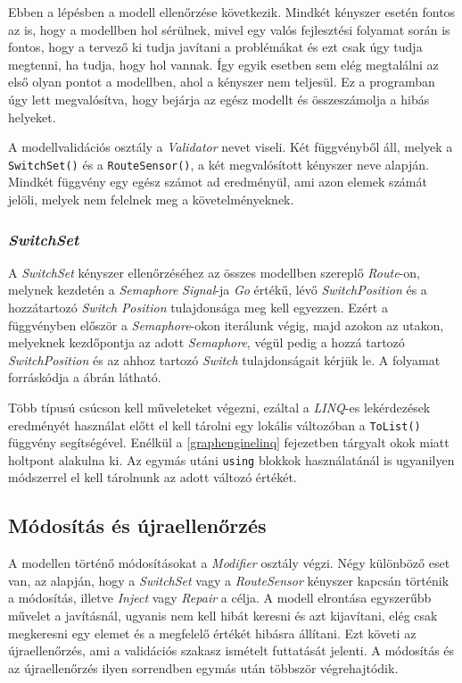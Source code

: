 Ebben a lépésben a modell ellenőrzése következik. Mindkét kényszer esetén fontos az is, hogy a modellben hol sérülnek, mivel egy valós fejlesztési folyamat során is fontos, hogy a tervező ki tudja javítani a problémákat és ezt csak úgy tudja megtenni, ha tudja, hogy hol vannak. Így egyik esetben sem elég megtalálni az első olyan pontot a modellben, ahol a kényszer nem teljesül. Ez a programban úgy lett megvalósítva, hogy bejárja az egész modellt és összeszámolja a hibás helyeket.

A modellvalidációs osztály a \emph{Validator} nevet viseli. Két függvényből áll, melyek a \texttt{SwitchSet()} és a \texttt{RouteSensor()}, a két megvalósított kényszer neve alapján. Mindkét függvény egy egész számot ad eredményül, ami azon elemek számát jelöli, melyek nem felelnek meg a követelményeknek. 

\subsubsection{\emph{SwitchSet}}

A \emph{SwitchSet} kényszer ellenőrzéséhez az összes modellben szereplő \emph{Route}-on, melynek kezdetén a \emph{Semaphore} \emph{Signal}-ja \emph{Go} értékű, lévő \emph{SwitchPosition} és a hozzátartozó \emph{Switch} \emph{Position} tulajdonsága meg kell egyezzen. Ezért a függvényben először a \emph{Semaphore}-okon iterálunk végig, majd azokon az utakon, melyeknek kezdőpontja az adott \emph{Semaphore}, végül pedig a hozzá tartozó \emph{SwitchPosition} és az ahhoz tartozó \emph{Switch} tulajdonságait kérjük le. A folyamat forráskódja a ábrán látható.

Több típusú csúcson kell műveleteket végezni, ezáltal a \emph{LINQ}-es lekérdezések eredményét használat előtt el kell tárolni egy lokális változóban a \texttt{ToList()} függvény segítségével. Enélkül a \ref{graphenginelinq} fejezetben tárgyalt okok miatt holtpont alakulna ki. Az egymás utáni \texttt{using} blokkok használatánál is ugyanilyen módszerrel el kell tárolnunk az adott változó értékét.

\subsection{Módosítás és újraellenőrzés}

A modellen történő módosításokat a \emph{Modifier} osztály végzi. Négy különböző eset van, az alapján, hogy a \emph{SwitchSet} vagy a \emph{RouteSensor} kényszer kapcsán történik a módosítás, illetve \emph{Inject} vagy \emph{Repair} a célja. A modell elrontása egyszerűbb művelet a javításnál, ugyanis nem kell hibát keresni és azt kijavítani, elég csak megkeresni egy elemet és a megfelelő értékét hibásra állítani. Ezt követi az újraellenőrzés, ami a validációs szakasz ismételt futtatását jelenti. A módosítás és az újraellenőrzés ilyen sorrendben egymás után többször végrehajtódik.

